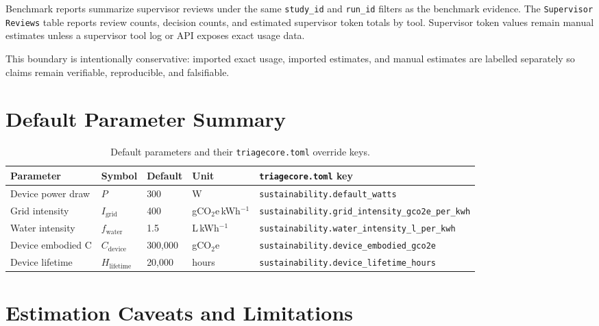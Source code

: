 \documentclass[12pt]{article}
\begin{document}
Benchmark reports summarize supervisor reviews under the same
\texttt{study\_id} and \texttt{run\_id} filters as the benchmark evidence. The
\texttt{Supervisor Reviews} table reports review counts, decision counts, and
estimated supervisor token totals by tool. Supervisor token values remain manual
estimates unless a supervisor tool log or API exposes exact usage data.

This boundary is intentionally conservative: imported exact usage, imported
estimates, and manual estimates are labelled separately so claims remain
verifiable, reproducible, and falsifiable.

\section{Default Parameter Summary}

\begin{table}[h!]
\centering
\begin{tabular}{@{}lllll@{}}
\toprule
Parameter & Symbol & Default & Unit & \texttt{triagecore.toml} key \\
\midrule
Device power draw    & $P$                  & 300       & W               & \texttt{sustainability.default\_watts} \\
Grid intensity       & $I_{\text{grid}}$    & 400       & gCO$_2$e\,kWh$^{-1}$ & \texttt{sustainability.grid\_intensity\_gco2e\_per\_kwh} \\
Water intensity      & $f_{\text{water}}$   & 1.5       & L\,kWh$^{-1}$   & \texttt{sustainability.water\_intensity\_l\_per\_kwh} \\
Device embodied C    & $C_{\text{device}}$  & 300,000   & gCO$_2$e        & \texttt{sustainability.device\_embodied\_gco2e} \\
Device lifetime      & $H_{\text{lifetime}}$& 20,000    & hours           & \texttt{sustainability.device\_lifetime\_hours} \\
\bottomrule
\end{tabular}
\caption{Default parameters and their \texttt{triagecore.toml} override keys.}
\end{table}

\section{Estimation Caveats and Limitations}
\label{sec:caveats}
\end{document}
